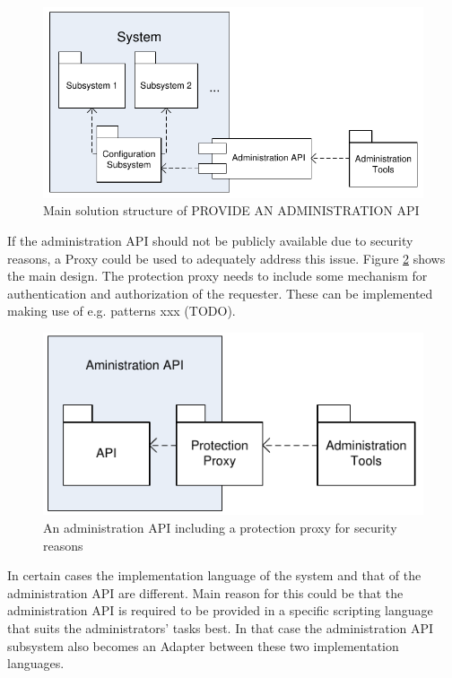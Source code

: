 \begin{figure}[h]
\centering
\includegraphics{patterns/provideAPIDiagram-01.pdf}
\caption{Main solution structure of PROVIDE AN ADMINISTRATION API}
\label{fig:provideAPIDiagram-01}
\end{figure}

If the administration API should not be publicly available due to security reasons, a {\sc Proxy} \cite{Buschmann1996} could be used to adequately address this issue. Figure \ref{fig:provideAPIDiagram-02} shows the main design. The protection proxy needs to include some mechanism for authentication and authorization of the requester. These can be implemented making use of e.g. patterns xxx (TODO).

\begin{figure}[h]
\centering
\includegraphics{patterns/provideAPIDiagram-02.pdf}
\caption{An administration API including a protection proxy for security reasons}
\label{fig:provideAPIDiagram-02}
\end{figure}

In certain cases the implementation language of the system and that of the administration API are different. Main reason for this could be that the administration API is required to be provided in a specific scripting language that suits the administrators' tasks best. In that case the administration API subsystem also becomes an {\sc Adapter} \cite{Gamma95} between these two implementation languages.

